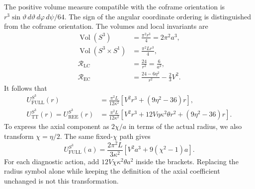 The positive volume measure compatible with the coframe orientation is
$r^3\sin\vartheta\,d\vartheta\,d\varphi\,d\psi/64$.
The sign of the angular coordinate ordering is distinguished from the
coframe orientation. The volumes and local invariants are
\begin{equation}
\begin{aligned}
\operatorname{Vol}(S^3)&=\frac{\pi^2r^3}{4}=2\pi^2a^3,\\
\operatorname{Vol}(S^3\times S^1)&=\frac{\pi^2Lr^3}{4},\\
\mathcal R_{\mathrm{LC}}&=\frac{24}{r^2}=\frac6{a^2},\\
\mathcal R_{\mathrm{EC}}&=\frac{24-6\eta^2}{r^2}-\frac23V^2.
\end{aligned}
\tag{M3-02}\label{eq:M3-02}
\end{equation}
It follows that
\begin{equation}
\begin{aligned}
U^{S^3}_{\mathrm{FULL}}(r)
 &=\frac{\pi^2L}{12\kappa^2}
   \left[V^2r^3+(9\eta^2-36)r\right],\\
U^{S^3}_{\mathrm{TT}}(r)=U^{S^3}_{\mathrm{REE}}(r)
 &=\frac{\pi^2L}{12\kappa^2}
   \left[V^2r^3+12V\eta\kappa^2\theta r^2+(9\eta^2-36)r\right].
\end{aligned}
\tag{M3-03}\label{eq:M3-03}
\end{equation}
To express the axial component as $2\chi/a$ in terms of the actual radius,
we also transform $\chi=\eta/2$. The same fixed-$\chi$ path gives
\begin{equation}
U^{S^3}_{\mathrm{FULL}}(a)
=\frac{2\pi^2L}{3\kappa^2}
\left[V^2a^3+9(\chi^2-1)a\right].
\tag{M3-04}\label{eq:M3-04}
\end{equation}
For each diagnostic action, add $12V\chi\kappa^2\theta a^2$ inside the
brackets. Replacing the radius symbol alone while keeping the definition
of the axial coefficient unchanged is not this transformation.

